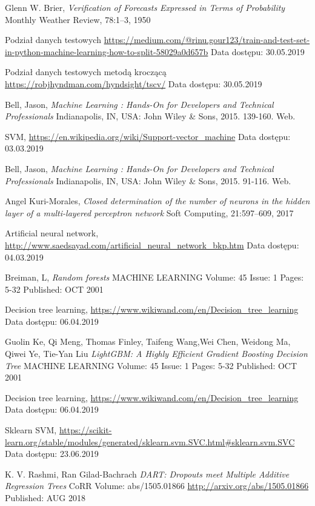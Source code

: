 \documentclass[a4paper, twoside, 11pt, openright]{article}
\begin{document}
\begin{thebibliography}{9}
	Glenn W. Brier, 
  \textit{Verification of Forecasts Expressed in Terms of Probability}
  Monthly Weather Review, 78:1–3, 1950

 Podział danych testowych \url{https://medium.com/@rinu.gour123/train-and-test-set-in-python-machine-learning-how-to-split-58029a0d657b}
 Data dostępu: 30.05.2019
 
 
 Podział danych testowych metodą kroczącą \url{https://robjhyndman.com/hyndsight/tscv/}
 Data dostępu: 30.05.2019
 
	Bell, Jason, \textit{Machine Learning : Hands-On for Developers and Technical Professionals}  Indianapolis, IN, USA: John Wiley \& Sons, 2015. 139-160. Web.
	
	SVM, \url{https://en.wikipedia.org/wiki/Support-vector_machine} 
	Data dostępu: 03.03.2019

	Bell, Jason, \textit{Machine Learning : Hands-On for Developers and Technical Professionals}  Indianapolis, IN, USA: John Wiley \& Sons, 2015. 91-116. Web.


	Angel Kuri-Morales, 
  \textit{Closed determination of the number of neurons in the hidden layer of a multi-layered perceptron network}
  Soft Computing, 21:597–609, 2017

	Artificial neural network, \url{http://www.saedsayad.com/artificial_neural_network_bkp.htm} 
	Data dostępu: 04.03.2019

	Breiman, L, 
  \textit{Random forests}
	MACHINE LEARNING  Volume: 45   Issue: 1   Pages: 5-32   Published: OCT 2001


	Decision tree learning, \url{https://www.wikiwand.com/en/Decision_tree_learning} 
	Data dostępu: 06.04.2019


Guolin Ke, Qi Meng, Thomas Finley, Taifeng Wang,Wei Chen, Weidong Ma, Qiwei Ye, Tie-Yan Liu
  \textit{LightGBM: A Highly Efficient Gradient Boosting Decision Tree}
	MACHINE LEARNING  Volume: 45   Issue: 1   Pages: 5-32   Published: OCT 2001

	Decision tree learning, \url{https://www.wikiwand.com/en/Decision_tree_learning} 
	Data dostępu: 06.04.2019

	Sklearn SVM, \url{https://scikit-learn.org/stable/modules/generated/sklearn.svm.SVC.html#sklearn.svm.SVC}
	Data dostępu: 23.06.2019

	K. V. Rashmi, Ran Gilad-Bachrach
	\textit{DART: Dropouts meet Multiple Additive Regression Trees}
	CoRR Volume: abs/1505.01866 \url{http://arxiv.org/abs/1505.01866} Published: AUG 2018

\end{thebibliography}
\end{document}
